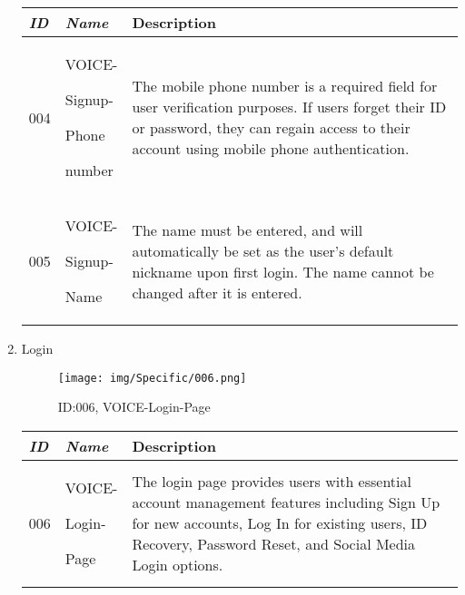 \documentclass[conference]{IEEEtran}
\begin{document}
\begin{enumerate}[label=\arabic*]
    \vspace{2em}

    \begin{table}[h]
    \def\arraystretch{1.2} \small
        \begin{tabular}{|p{1cm}|p{1.8cm}|p{4.8cm}|}
        \hline
            \textit{\textbf{ID}} & \textit{\textbf{Name}} & {\textbf{Description}} \\
        \hline 
            004 \par & VOICE-\par Signup-\par Phone\par number & The mobile phone number is a required field for user verification purposes. If users forget their ID or password, they can regain access to their account using mobile phone authentication. \\ 
        \hline
            005 \par & VOICE-\par Signup-\par Name & The name must be entered, and will automatically be set as the user's default nickname upon first login. The name cannot be changed after it is entered. \\
        \hline
        \end{tabular}
    \end{table}

    \vspace{2em}
    
    \item Login\par
    \vspace{0.3em}

    \begin{figure}[h]
        \centering
        \texttt{[image: img/Specific/006.png]}
        \caption{ID:006, VOICE-Login-Page}
    \end{figure}

    \begin{table}[h]
    \def\arraystretch{1.2} \small
        \begin{tabular}{|p{1cm}|p{1.8cm}|p{4.8cm}|}
        \hline
            \textit{\textbf{ID}} & \textit{\textbf{Name}} & {\textbf{Description}} \\
        \hline
            006 \par & VOICE-\par Login-\par Page & The login page provides users with essential account management features including Sign Up for new accounts, Log In for existing users, ID Recovery, Password Reset, and Social Media Login options. \\
        \hline
        \end{tabular}
    \end{table}


\end{enumerate}
\end{document}
